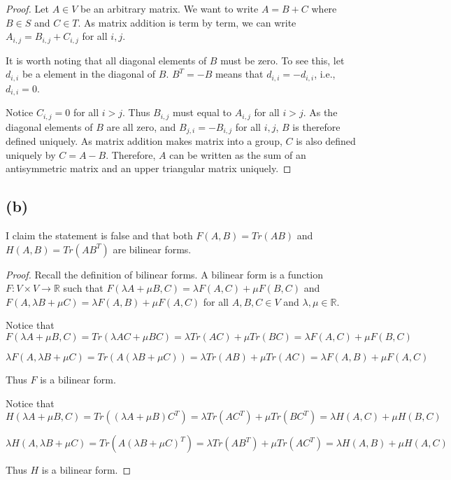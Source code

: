 \documentclass[12pt, a4paper]{article}
\theoremstyle{definition}
\theoremstyle{remark}
\newcommand{\bb}[1]{\mathbb{#1}}
\begin{document}
\begin{proof}

	Let $A \in V$ be an arbitrary matrix. We want to write $A = B + C$ where $B \in S$ and $C \in T$. As matrix addition is term by term, we can write $A_{i,j} = B_{i,j} + C_{i,j}$ for all $i, j$.

	It is worth noting that all diagonal elements of $B$ must be zero. To see this, let $d_{i,i}$ be a element in the diagonal of $B$. $B^T = -B$ means that $d_{i,i} = -d_{i,i}$, i.e., $d_{i,i} = 0$.  

	Notice $C_{i, j} = 0$ for all $i > j$. Thus $B_{i, j} $ must equal to $A_{i, j}$ for all $i > j$. As the diagonal elements of $B$ are all zero, and $B_{j,i} = -B_{i,j}$ for all $i, j$, $B$ is therefore defined uniquely. 
	As matrix addition makes matrix into a group, $C$ is also defined uniquely by $C = A -B$. Therefore, $A$ can be written as the sum of an antisymmetric matrix and an upper triangular matrix uniquely.
\end{proof}

\subsection{(b)}

I claim the statement is false and that both $F(A, B) = Tr(AB)$ and $H(A,B) = Tr(AB^T)$ are bilinear forms.

\begin{proof}
	Recall the definition of bilinear forms. A bilinear form is a function $F: V \times V \to \bb{R}$ such that $F(\lambda A + \mu B, C) = \lambda F(A, C) + \mu F(B, C)$ and $F(A, \lambda B + \mu C) = \lambda F(A, B) + \mu F(A, C)$ for all $A, B, C \in V$ and $\lambda, \mu \in \bb{R}$.

	Notice that 
	$$F(\lambda A + \mu B, C) = Tr(\lambda AC + \mu BC) = \lambda Tr(AC) + \mu Tr(BC) = \lambda F(A,C) + \mu F(B,C)$$

	$$\lambda F(A, \lambda B+ \mu C)  = Tr(A(\lambda B + \mu C)) = \lambda Tr(AB) + \mu Tr(AC) = \lambda F(A,B) + \mu F(A,C)$$

	Thus $F$ is a bilinear form. 

	Notice that 
	$$H(\lambda A + \mu B, C) = Tr((\lambda A + \mu B)C^T) = \lambda Tr(AC^T) + \mu Tr(BC^T) = \lambda H(A,C) + \mu H(B,C)$$

	$$\lambda H(A, \lambda B+ \mu C)  = Tr(A(\lambda B + \mu C)^T) = \lambda Tr(AB^T) + \mu Tr(AC^T) = \lambda H(A,B) + \mu H(A,C)$$

	Thus $H$ is a bilinear form.
\end{proof}
\end{document}
